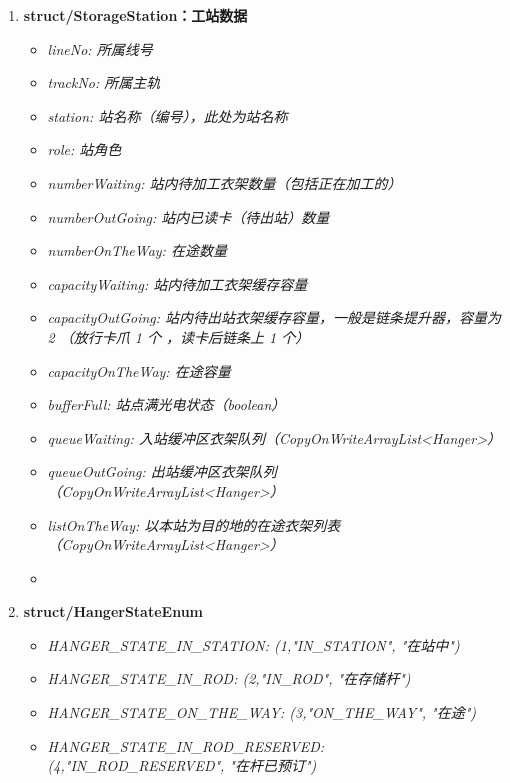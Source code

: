 \begin{enumerate}[label=\arabic*)]
\begin{itemize}
			\item \it{bufferFull}: 存储杆满光电状态
			\item \it{queueInRod}: 杆内衣架队列(CopyOnWriteArrayList <Hanger>)
			\item \it{listOnTheWay}: 以此杆为终点的在途衣架列表(CopyOnWriteArrayList<Hanger>)
		\end{itemize}
		\item \bf{struct/StorageStation}：工站数据\label{sec:param-storageStation}
		\begin{itemize}
			\item \it{lineNo}: 所属线号
			\item \it{trackNo}: 所属主轨
			\item \it{station}: 站名称（编号），此处为站名称
			\item \it{role}: 站角色
			\item \it{numberWaiting}: 站内待加工衣架数量（包括正在加工的）
			\item \it{numberOutGoing}: 站内已读卡（待出站）数量
			\item \it{numberOnTheWay}: 在途数量
			\item \it{capacityWaiting}: 站内待加工衣架缓存容量
			\item \it{capacityOutGoing}: 站内待出站衣架缓存容量，一般是链条提升器，容量为 2 （放行卡爪 1 个 ，读卡后链条上 1 个）
			\item \it{capacityOnTheWay}: 在途容量
			\item \it{bufferFull}: 站点满光电状态（boolean）
			\item \it{queueWaiting}: 入站缓冲区衣架队列（CopyOnWriteArrayList<Hanger>）
			\item \it{queueOutGoing}: 出站缓冲区衣架队列（CopyOnWriteArrayList<Hanger>）
			\item \it{listOnTheWay}: 以本站为目的地的在途衣架列表（CopyOnWriteArrayList<Hanger>）
			\item 
		\end{itemize}
		\item \bf{struct/HangerStateEnum}
		\begin{itemize}
			\item \it{HANGER\_STATE\_IN\_STATION}: (1,"IN\_STATION", "在站中")
			\item \it{HANGER\_STATE\_IN\_ROD}: (2,"IN\_ROD", "在存储杆")
			\item \it{HANGER\_STATE\_ON\_THE\_WAY}: (3,"ON\_THE\_WAY", "在途")
			\item \it{HANGER\_STATE\_IN\_ROD\_RESERVED}: (4,"IN\_ROD\_RESERVED", "在杆已预订")

\end{itemize}
\end{enumerate}
